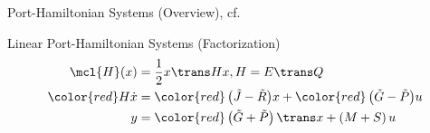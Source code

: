 \begin{frame}{Port-Hamiltonian Systems (Overview), cf.~\cite{Morandin2022}}
    \begin{block}{Linear Port-Hamiltonian Systems (Factorization)}
        \begin{align*}
            \mcl{H}(x) &= \frac{1}{2} x\trans H x, H = E\trans Q \\
            {\color{red}H} \dot{x} &= {\color{red}\left( \tilde{J} - \tilde{R} \right)} x + {\color{red}\left( \tilde{G} - \tilde{P} \right)} u \\
            y &= {\color{red}\left( \tilde{G} + \tilde{P} \right)\trans} x + \left( M + S \right) u
        \end{align*}
    \end{block}
\end{frame}

